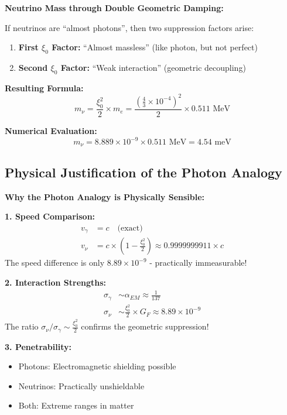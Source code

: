 	\begin{keyresult}
		\textbf{Neutrino Mass through Double Geometric Damping:}
		
		If neutrinos are ``almost photons'', then two suppression factors arise:
		
		\begin{enumerate}
			\item \textbf{First $\xi_0$ Factor:} ``Almost massless'' (like photon, but not perfect)
			\item \textbf{Second $\xi_0$ Factor:} ``Weak interaction'' (geometric decoupling)
		\end{enumerate}
		
		\textbf{Resulting Formula:}
		\begin{equation}
			\boxed{m_\nu = \frac{\xi_0^2}{2} \times m_e = \frac{(\frac{4}{3} \times 10^{-4})^2}{2} \times 0.511 \text{ MeV}}
		\end{equation}
		
		\textbf{Numerical Evaluation:}
		\begin{equation}
			m_\nu = 8.889 \times 10^{-9} \times 0.511 \text{ MeV} = 4.54 \text{ meV}
		\end{equation}
	\end{keyresult}
	
	\subsection{Physical Justification of the Photon Analogy}
	
	\begin{photon}
		\textbf{Why the Photon Analogy is Physically Sensible:}
		
		\textbf{1. Speed Comparison:}
		\begin{align}
			v_\gamma &= c \quad \text{(exact)} \\
			v_\nu &= c \times \left(1 - \frac{\xi_0^2}{2}\right) \approx 0.9999999911 \times c
		\end{align}
		The speed difference is only $8.89 \times 10^{-9}$ - practically immeasurable!
		
		\textbf{2. Interaction Strengths:}
		\begin{align}
			\sigma_\gamma &\sim \alpha_{EM} \approx \frac{1}{137} \\
			\sigma_\nu &\sim \frac{\xi_0^2}{2} \times G_F \approx 8.89 \times 10^{-9}
		\end{align}
		The ratio $\sigma_\nu/\sigma_\gamma \sim \frac{\xi_0^2}{2}$ confirms the geometric suppression!
		
		\textbf{3. Penetrability:}
		\begin{itemize}
			\item Photons: Electromagnetic shielding possible
			\item Neutrinos: Practically unshieldable
			\item Both: Extreme ranges in matter
		\end{itemize}
	\end{photon}
	
